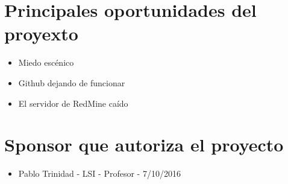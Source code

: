 \documentclass[a4paper,10pt]{scrartcl}
\begin{document}
\section{Principales oportunidades del proyexto}
\begin{itemize}
	\item Miedo escénico
	\item Github dejando de funcionar
	\item El servidor de RedMine caído
\end{itemize}

\section{Sponsor que autoriza el proyecto}
\begin{itemize}
	\item Pablo Trinidad - LSI - Profesor  - 7/10/2016
\end{itemize}

\end{document}

